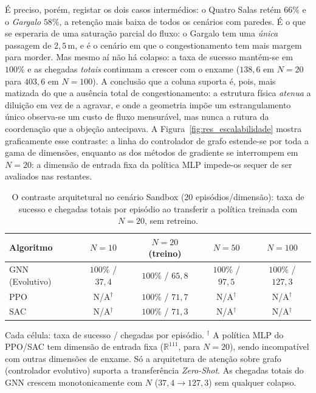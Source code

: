 \documentclass[12pt,reqno, twoside]{amsbook}
\theoremstyle{plain}
\numberwithin{equation}{chapter}
\numberwithin{section}{chapter}
\numberwithin{table}{chapter}
\numberwithin{figure}{chapter}
\begin{document}
É preciso, porém, registar os dois casos intermédios: o Quatro Salas retém $66\%$ e o \emph{Gargalo} $58\%$, a retenção mais baixa de todos os cenários com paredes. É o que se esperaria de uma saturação parcial do fluxo: o Gargalo tem uma \emph{única} passagem de $2{,}5$\,m, e é o cenário em que o congestionamento tem mais margem para morder. Mas mesmo aí não há colapso: a taxa de sucesso mantém-se em $100\%$ e as chegadas \emph{totais} continuam a crescer com o enxame ($138{,}6$ em $N=20$ para $403{,}6$ em $N=100$). A conclusão que a coluna suporta é, pois, mais matizada do que a ausência total de congestionamento: a estrutura física \emph{atenua} a diluição em vez de a agravar, e onde a geometria impõe um estrangulamento único observa-se um custo de fluxo mensurável, mas nunca a rutura da coordenação que a objeção antecipava. A Figura~\ref{fig:res_escalabilidade} mostra graficamente esse contraste: a linha do controlador de grafo estende-se por toda a gama de dimensões, enquanto as dos métodos de gradiente se interrompem em $N=20$: a dimensão de entrada fixa da política MLP impede-os sequer de ser avaliados nas restantes.

\begin{table}[!htbp]
\centering
\footnotesize
\caption[O contraste arquitetural no Sandbox]{O contraste arquitetural no cenário Sandbox (20 episódios/dimensão): taxa de sucesso e chegadas totais por episódio ao transferir a política treinada com $N=20$, sem retreino.}
\label{tab:res_scale}
\renewcommand{\arraystretch}{1.3}
\begin{tabular}{|l|c|c|c|c|}
\hline
\textbf{Algoritmo} & \textbf{$N=10$} & \textbf{$N=20$ (treino)} & \textbf{$N=50$} & \textbf{$N=100$} \\ \hline
GNN (Evolutivo) & $100\%$ / $37{,}4$ & $100\%$ / $65{,}8$ & $100\%$ / $97{,}5$ & $100\%$ / $127{,}3$ \\ \hline
PPO & N/A$^{\dagger}$ & $100\%$ / $71{,}7$ & N/A$^{\dagger}$ & N/A$^{\dagger}$ \\ \hline
SAC & N/A$^{\dagger}$ & $100\%$ / $71{,}3$ & N/A$^{\dagger}$ & N/A$^{\dagger}$ \\ \hline
\end{tabular}

\vspace{0.4em}
{\footnotesize Cada célula: taxa de sucesso / chegadas por episódio. $^{\dagger}$ A política MLP do PPO/SAC tem dimensão de entrada fixa ($\mathbb{R}^{111}$, para $N=20$), sendo incompatível com outras dimensões de enxame. Só a arquitetura de atenção sobre grafo (controlador evolutivo) suporta a transferência \textit{Zero-Shot}. As chegadas totais do GNN crescem monotonicamente com $N$ ($37{,}4 \rightarrow 127{,}3$) sem qualquer colapso.}
\end{table}
\end{document}

